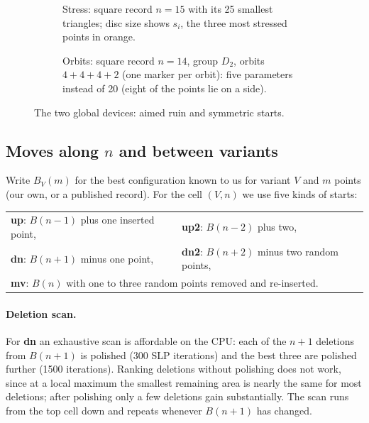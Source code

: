 \documentclass[11pt]{article}
\theoremstyle{remark}
\begin{document}
\begin{figure}[t]
  \centering
  \begin{subfigure}[b]{0.45\linewidth}\centering
    \begin{tikzpicture}[scale=4.3]\end{tikzpicture}
    \caption{Stress: square record $n=15$ with its 25 smallest triangles; disc size shows $s_i$, the three most
    stressed points in orange.}
  \end{subfigure}\hfill
  \begin{subfigure}[b]{0.45\linewidth}\centering
    \begin{tikzpicture}[scale=4.3]\end{tikzpicture}
    \caption{Orbits: square record $n=14$, group $D_2$, orbits $4+4+4+2$ (one marker per orbit): five parameters
    instead of 20 (eight of the points lie on a side).}
  \end{subfigure}
  \caption{The two global devices: aimed ruin and symmetric starts.}
  \label{fig:global}
\end{figure}

\subsection{Moves along \texorpdfstring{$n$}{n} and between variants}\label{sec:moves}

Write $B_V(m)$ for the best configuration known to us for variant $V$ and $m$ points (our own, or a published record).
For the cell $(V, n)$ we use five kinds of starts:
\begin{center}
\begin{tabular}{ll}
  \textbf{up}: $B(n-1)$ plus one inserted point, & \textbf{up2}: $B(n-2)$ plus two, \\
  \textbf{dn}: $B(n+1)$ minus one point, & \textbf{dn2}: $B(n+2)$ minus two random points, \\
  \multicolumn{2}{l}{\textbf{mv}: $B(n)$ with one to three random points removed and re-inserted.}
\end{tabular}
\end{center}

\paragraph{Deletion scan.} For \textbf{dn} an exhaustive scan is affordable on the CPU: each of the $n+1$
deletions from $B(n+1)$ is polished (300 SLP iterations) and the best three are polished further (1500 iterations).
Ranking deletions without polishing does not work, since at a local maximum the smallest remaining area is nearly the
same for most deletions; after polishing only a few deletions gain substantially. The scan runs from the top cell down
and repeats whenever $B(n+1)$ has changed.
\end{document}
